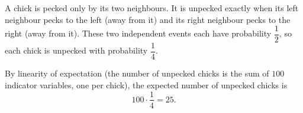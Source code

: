 A chick is pecked only by its two neighbours. It is unpecked exactly when its left neighbour pecks to the left (away from it) and its right neighbour pecks to the right (away from it). These two independent events each have probability $\dfrac{1}{2}$, so each chick is unpecked with probability $\dfrac{1}{4}$.

By linearity of expectation (the number of unpecked chicks is the sum of $100$ indicator variables, one per chick), the expected number of unpecked chicks is
\[
100\cdot\dfrac{1}{4}=\boxed{25}.
\]
